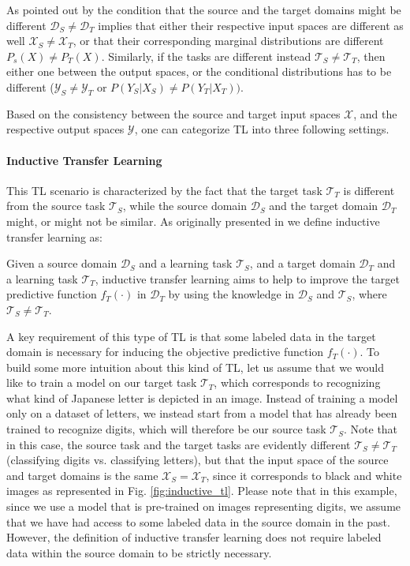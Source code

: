 As pointed out by \citet{pan2009survey} the condition that the source and the target domains might be different $\mathcal{D}_S \neq \mathcal{D}_T$ implies that either their respective input spaces are different as well $\mathcal{X}_S\neq\mathcal{X}_T$, or that their corresponding marginal distributions are different $P_s(X)\neq P_T(X)$. Similarly, if the tasks are different instead $\mathcal{T}_S\neq\mathcal{T}_T$, then either one between the output spaces, or the conditional distributions has to be different ($\mathcal{Y}_S\neq\mathcal{Y}_T$ or $P(Y_S|X_S)\neq P(Y_T|X_T))$.

Based on the consistency between the source and target input spaces $\mathcal{X}$, and the respective output spaces $\mathcal{Y}$, one can categorize TL into three following settings.

\paragraph{Inductive Transfer Learning}
This TL scenario is characterized by the fact that the target task $\mathcal{T}_T$ is different from the source task $\mathcal{T}_S$, while the source domain $\mathcal{D}_S$ and the target domain $\mathcal{D}_T$ might, or might not be similar. As originally presented in \cite{pan2009survey} we define inductive transfer learning as:
\begin{definition}
	Given a source domain $\mathcal{D}_S$ and a learning task $\mathcal{T}_S$, and a target domain $\mathcal{D}_T$ and a learning task $\mathcal{T}_T$, inductive transfer learning aims to help to improve the target predictive function $f_T(\cdot)$ in $\mathcal{D}_T$ by using the knowledge in $\mathcal{D}_S$ and $\mathcal{T}_S$, where $\mathcal{T}_S \neq \mathcal{T}_T$. 
\end{definition}
A key requirement of this type of TL is that some labeled data in the target domain is necessary for inducing the objective predictive function $f_T(\cdot)$. To build some more intuition about this kind of TL, let us assume that we would like to train a model on our target task $\mathcal{T}_T$, which corresponds to recognizing what kind of Japanese letter is depicted in an image. Instead of training a model only on a dataset of letters, we instead start from a model that has already been trained to recognize digits, which will therefore be our source task $\mathcal{T}_S$. Note that in this case, the source task and the target tasks are evidently different $\mathcal{T}_S \neq \mathcal{T}_T$ (classifying digits vs. classifying letters), but that the input space of the source and target domains is the same $\mathcal{X}_S = \mathcal{X}_T$, since it corresponds to black and white images as represented in Fig. \ref{fig:inductive_tl}. Please note that in this example, since we use a model that is pre-trained on images representing digits, we assume that we have had access to some labeled data in the source domain in the past. However, the definition of inductive transfer learning does not require labeled data within the source domain to be strictly necessary.

